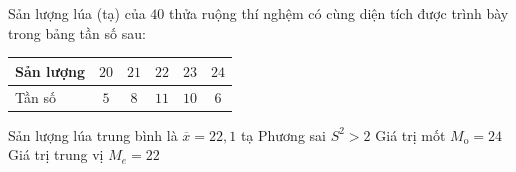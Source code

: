\begin{ex}%
	Sản lượng lúa (tạ) của $40$ thửa ruộng thí nghệm có cùng diện tích được trình bày trong bảng tần số sau:
	\begin{center}
		\begin{tabular}{|l|c|c|c|c|c|}
		\hline Sản lượng & $20$ & $21$ & $22$ & $23$ & $24$ \\
		\hline Tần số & $5$ & $8$ & $11$ & $10$ & $6$ \\
		\hline
	\end{tabular}
	\end{center}
	\choiceTF
	{\True Sản lượng lúa trung bình là $\overline{x}=22,1$ tạ}
	{Phương sai $S^2>2$}
	{Giá trị mốt $M_{\text{o}}=24$}
	{\True Giá trị trung vị $M_e=22$}
\end{ex}
\caukq

